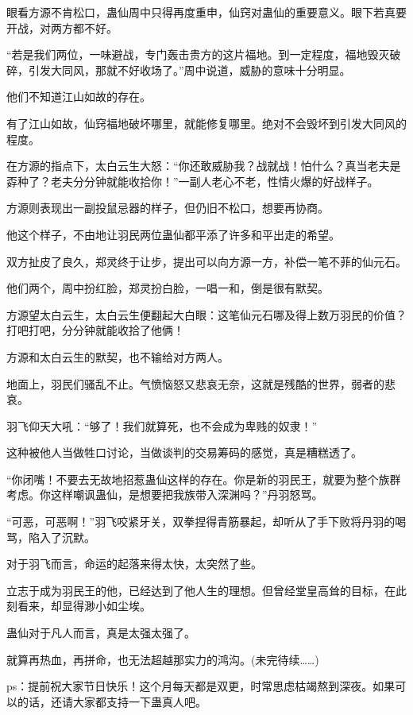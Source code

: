 \begin{this_body}
眼看方源不肯松口，蛊仙周中只得再度重申，仙窍对蛊仙的重要意义。眼下若真要开战，对两方都不好。

“若是我们两位，一味避战，专门轰击贵方的这片福地。到一定程度，福地毁灭破碎，引发大同风，那就不好收场了。”周中说道，威胁的意味十分明显。

他们不知道江山如故的存在。

有了江山如故，仙窍福地破坏哪里，就能修复哪里。绝对不会毁坏到引发大同风的程度。

在方源的指点下，太白云生大怒：“你还敢威胁我？战就战！怕什么？真当老夫是孬种了？老夫分分钟就能收拾你！”一副人老心不老，性情火爆的好战样子。

方源则表现出一副投鼠忌器的样子，但仍旧不松口，想要再协商。

他这个样子，不由地让羽民两位蛊仙都平添了许多和平出走的希望。

双方扯皮了良久，郑灵终于让步，提出可以向方源一方，补偿一笔不菲的仙元石。

他们两个，周中扮红脸，郑灵扮白脸，一唱一和，倒是很有默契。

方源望太白云生，太白云生便翻起大白眼：这笔仙元石哪及得上数万羽民的价值？打吧打吧，分分钟就能收拾了他俩！

方源和太白云生的默契，也不输给对方两人。

地面上，羽民们骚乱不止。气愤恼怒又悲哀无奈，这就是残酷的世界，弱者的悲哀。

羽飞仰天大吼：“够了！我们就算死，也不会成为卑贱的奴隶！”

这种被他人当做牲口讨论，当做谈判的交易筹码的感觉，真是糟糕透了。

“你闭嘴！不要去无故地招惹蛊仙这样的存在。你是新的羽民王，就要为整个族群考虑。你这样嘲讽蛊仙，是想要把我族带入深渊吗？”丹羽怒骂。

“可恶，可恶啊！”羽飞咬紧牙关，双拳捏得青筋暴起，却听从了手下败将丹羽的喝骂，陷入了沉默。

对于羽飞而言，命运的起落来得太快，太突然了些。

立志于成为羽民王的他，已经达到了他人生的理想。但曾经堂皇高耸的目标，在此刻看来，却显得渺小如尘埃。

蛊仙对于凡人而言，真是太强太强了。

就算再热血，再拼命，也无法超越那实力的鸿沟。(未完待续……)

ps：提前祝大家节日快乐！这个月每天都是双更，时常思虑枯竭熬到深夜。如果可以的话，还请大家都支持一下蛊真人吧。

\end{this_body}

